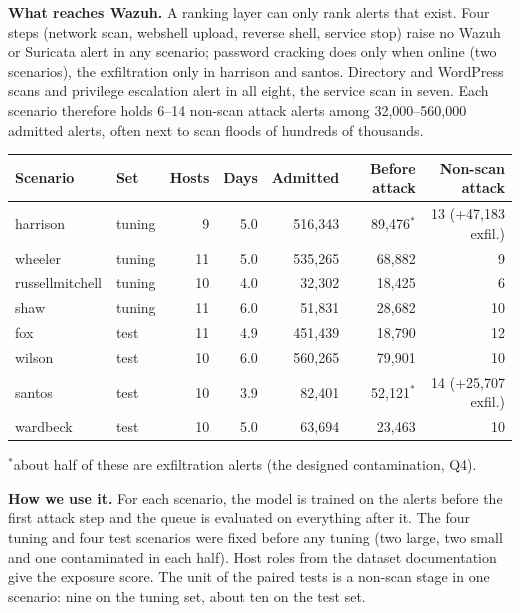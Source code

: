 \documentclass[10.5pt,a4paper]{article}
\newcommand{\sub}[1]{\par\smallskip\noindent\textbf{#1}\quad}
\begin{document}
\sub{What reaches Wazuh.} A ranking layer can only rank alerts that exist. Four steps (network scan, webshell upload, reverse shell, service stop) raise no Wazuh or Suricata alert in any scenario; password cracking does only when online (two scenarios), the exfiltration only in harrison and santos. Directory and WordPress scans and privilege escalation alert in all eight, the service scan in seven. Each scenario therefore holds 6--14 non-scan attack alerts among 32{,}000--560{,}000 admitted alerts, often next to scan floods of hundreds of thousands.

\begin{center}\small
\begin{tabular}{@{}l l r r r r r@{}}
\toprule
Scenario & Set & Hosts & Days & Admitted & Before attack & Non-scan attack \\
\midrule
harrison & tuning & 9 & 5.0 & 516{,}343 & 89{,}476$^\ast$ & 13 (+47{,}183 exfil.) \\
wheeler & tuning & 11 & 5.0 & 535{,}265 & 68{,}882 & 9 \\
russellmitchell & tuning & 10 & 4.0 & 32{,}302 & 18{,}425 & 6 \\
shaw & tuning & 11 & 6.0 & 51{,}831 & 28{,}682 & 10 \\
fox & test & 11 & 4.9 & 451{,}439 & 18{,}790 & 12 \\
wilson & test & 10 & 6.0 & 560{,}265 & 79{,}901 & 10 \\
santos & test & 10 & 3.9 & 82{,}401 & 52{,}121$^\ast$ & 14 (+25{,}707 exfil.) \\
wardbeck & test & 10 & 5.0 & 63{,}694 & 23{,}463 & 10 \\
\bottomrule
\end{tabular}
\par\smallskip\footnotesize $^\ast$about half of these are exfiltration alerts (the designed contamination, Q4).
\end{center}

\sub{How we use it.} For each scenario, the model is trained on the alerts before the first attack step and the queue is evaluated on everything after it. The four tuning and four test scenarios were fixed before any tuning (two large, two small and one contaminated in each half). Host roles from the dataset documentation give the exposure score. The unit of the paired tests is a non-scan stage in one scenario: nine on the tuning set, about ten on the test set.
\end{document}
